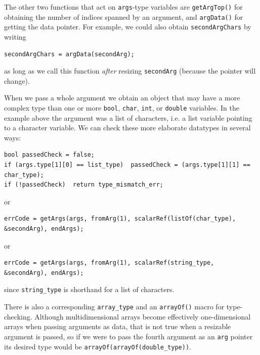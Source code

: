 \documentclass{article}
\newenvironment{code}{
       \begin{list}{}{
               \setlength{\leftmargin}{.4in}
               \setlength{\rightmargin}{0in}
               \setlength{\topsep}{.2in}
       }
       \small
       \item[] }
       { \end{list}   }
\begin{document}
The other two functions that act on \verb#args#-type variables are \verb#getArgTop()# for obtaining the number of indices spanned by an argument, and \verb#argData()# for getting the data pointer.  For example, we could also obtain \verb#secondArgChars# by writing

\begin{code} \begin{verbatim}
secondArgChars = argData(secondArg);
\end{verbatim} \end{code}

\noindent as long as we call this function \emph{after} resizing \verb#secondArg# (because the pointer will change).

When we pass a whole argument we obtain an object that may have a more complex type than one or more \verb#bool#, \verb#char#, \verb#int#, or \verb#double# variables.  In the example above the argument was a list of characters, i.e. a list variable pointing to a character variable.  We can check these more elaborate datatypes in several ways:

\begin{code} \begin{verbatim}
bool passedCheck = false;
if (args.type[1][0] == list_type)  passedCheck = (args.type[1][1] == char_type);
if (!passedCheck)  return type_mismatch_err;
\end{verbatim} \end{code}

\noindent or

\begin{code} \begin{verbatim}
errCode = getArgs(args, fromArg(1), scalarRef(listOf(char_type), &secondArg), endArgs);
\end{verbatim} \end{code}

\noindent or

\begin{code} \begin{verbatim}
errCode = getArgs(args, fromArg(1), scalarRef(string_type, &secondArg), endArgs);
\end{verbatim} \end{code}

\noindent since \verb#string_type# is shorthand for a list of characters.

There is also a corresponding \verb#array_type# and an \verb#arrayOf()# macro for type-checking.  Although multidimensional arrays become effectively one-dimensional arrays when passing arguments as data, that is not true when a resizable argument is passed, so if we were to pass the fourth argument as an \verb#arg# pointer its desired type would be \verb#arrayOf(arrayOf(double_type))#.
\end{document}
